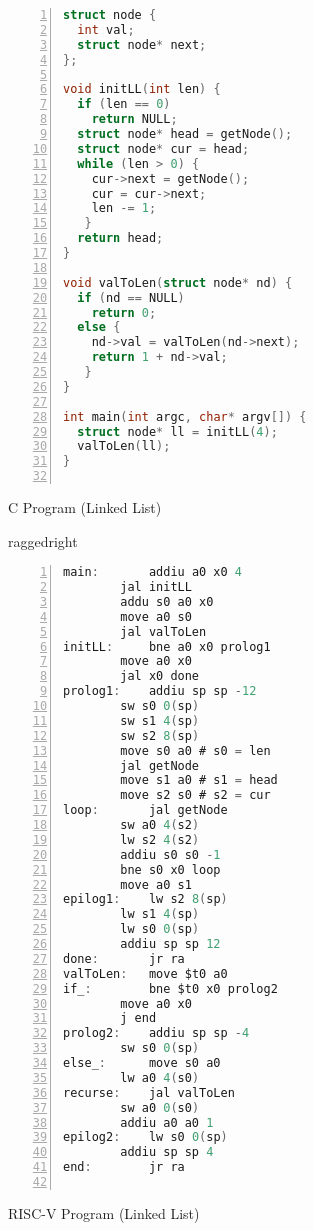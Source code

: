 \documentclass{article}
\begin{document}
\begin{figure}
\centering
\begin{minipage}{0.45\textwidth}
\renewcommand{\ttdefault}{pcr}
\begin{lstlisting}[language=C, basicstyle=\ttfamily, numbers=left, stepnumber=1, firstnumber=1, numberfirstline=true]
struct node {
  int val;
  struct node* next;
};

void initLL(int len) {
  if (len == 0)
    return NULL;
  struct node* head = getNode();
  struct node* cur = head;
  while (len > 0) {
    cur->next = getNode();
    cur = cur->next;
    len -= 1;
   }
  return head;
}

void valToLen(struct node* nd) {
  if (nd == NULL)
    return 0;
  else {
    nd->val = valToLen(nd->next);
    return 1 + nd->val;
   }
}

int main(int argc, char* argv[]) {
  struct node* ll = initLL(4);
  valToLen(ll);
}
  
\end{lstlisting}
\caption{C Program (Linked List)}
\vfill
\end{minipage}\hfill
%
\begin{minipage}{0.45\textwidth}
raggedright
\renewcommand{\ttdefault}{pcr}
\begin{lstlisting}[language=C, basicstyle=\ttfamily, keywordstyle=\bfseries, showstringspaces=false, morekeywords={jal, addu, move, bne, j, sw, addiu, lw, jr}, numbers=left, stepnumber=1, firstnumber=1, numberfirstline=true, numberstyle=\small]
main:		addiu a0 x0 4
		jal initLL
		addu s0 a0 x0
		move a0 s0
		jal valToLen
initLL: 	bne a0 x0 prolog1
		move a0 x0
		jal x0 done
prolog1:  	addiu sp sp -12
		sw s0 0(sp)
		sw s1 4(sp)
		sw s2 8(sp)
		move s0 a0 # s0 = len
		jal getNode
		move s1 a0 # s1 = head
		move s2 s0 # s2 = cur	
loop:		jal getNode
		sw a0 4(s2)
		lw s2 4(s2)
		addiu s0 s0 -1
		bne s0 x0 loop
		move a0 s1
epilog1:	lw s2 8(sp)
		lw s1 4(sp)
		lw s0 0(sp)
		addiu sp sp 12
done:		jr ra 
valToLen:	move $t0 a0
if_:		bne $t0 x0 prolog2
		move a0 x0
		j end
prolog2:	addiu sp sp -4
		sw s0 0(sp)
else_:		move s0 a0
		lw a0 4(s0)
recurse:	jal valToLen
		sw a0 0(s0)
		addiu a0 a0 1
epilog2:	lw s0 0(sp)
		addiu sp sp 4
end:		jr ra
		
\end{lstlisting}
\caption{RISC-V Program (Linked List)}
\end{minipage}
%
\end{figure}
\end{document}
